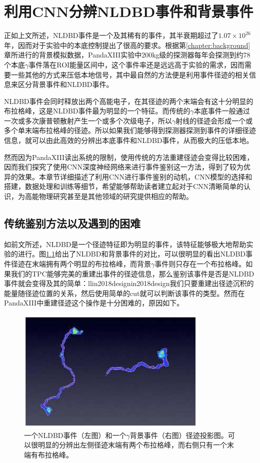 
\chapter{利用CNN分辨NLDBD事件和背景事件}
\label{chapter:cnn}

正如上文所述，NLDBD事件是一个及其稀有的事件，其半衰期超过了$1.07\times10^{26}$年，因而对于实验中的本底控制提出了很高的要求。根据第\ref{chapter:background}章所进行的背景模拟数据，PandaXIII实验中200kg级的探测器每年会探测到约78个本底$\gamma$事件落在ROI能量区间中，这个事件率还是远远高于实验的需求，因而需要一些其他的方式来压低本地信号，其中最自然的方法便是利用事件径迹的相关信息来区分背景事件和NLDBD事件。

NLDBD事件会同时释放出两个高能电子，在其径迹的两个末端会有这十分明显的布拉格峰，这是NLDBD事件最为明显的一个特征。而传统的$\gamma$本底事件一般通过一次或多次康普顿散射产生一个或多个次级电子，所以$\gamma$射线的径迹会形成一个或多个单末端布拉格峰的径迹。所以如果我们能够得到探测器探测到事件的详细径迹信息，就可以由此高效的分辨出本底事件和NLDBD事件，从而极大的压低本地。

然而因为PandaXIII读出系统的限制，使用传统的方法重建径迹会变得比较困难，因而我们探究了使用CNN深度神经网络来进行事件鉴别这一方法，得到了较为优异的效果。本章节详细描述了利用CNN进行事件鉴别的动机，CNN模型的选择和搭建，数据处理和训练等细节，希望能够帮助读者建立起对于CNN清晰简单的认识，为高能物理研究甚至是其他领域的研究提供相应的帮助。

\section{传统鉴别方法以及遇到的困难}

如前文所述，NLDBD是一个径迹特征即为明显的事件，该特征能够极大地帮助实验的进行。图\ref{fig:samples}给出了NLDBD和背景事件的对比，可以很明显的看出NLDBD事件径迹在末端拥有两个明显的布拉格峰，而背景$\gamma$事件则只存在一个布拉格峰。如果我们的TPC能够完美的重建出事件的径迹信息，那么鉴别该事件是否是NLDBD事件就会变得及其的简单：llin2018designin2018design我们只要重建出径迹沉积的能量随径迹位置的关系，然后使用简单的cut就可以判断该事件的类型。然而在PandaXIII中重建径迹这个操作是十分困难的，原因如下。

\begin{figure}[hbt]
    \centering
    \includegraphics[width=0.5\columnwidth]{pic/fig10.png}
    \caption{一个NLDBD事件（左图）和一个$\gamma$背景事件（右图）径迹投影图。可以很明显的分辨出左侧径迹末端有两个布拉格峰，而右侧只有一个末端有布拉格峰。}
    \label{fig:samples}
\end{figure}

